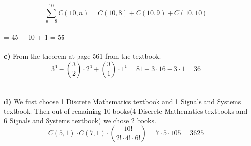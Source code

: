 \documentclass[12pt]{article}
\begin{document}
\[\sum_{n=8}^{10} C(10,n) = C(10,8) + C(10,9) + C(10,10)\]\\
\hspace*{6.8cm} =  45 + 10 + 1 = 56\\
\vspace*{0.4cm}\\
\textbf{c)} From the theorem at page 561 from the textbook.\\
\[3^{4} - \binom{3}{2}\cdot2^{4} + \binom{3}{1}\cdot1^{4} = 81 - 3\cdot16 - 3\cdot1 = 36\]\\
\vspace*{0.4cm}\\
\textbf{d)} We first choose 1  Discrete Mathematics textbook and 1 Signals and Systems textbook. Then out of remaining 10 books(4 Discrete Mathematics textbooks and 6 Signals and Systems textbook) we chose 2 books. \\
\[C(5,1)\cdot C(7,1)\cdot (\frac{10!}{2!\cdot4!\cdot6!}) = 7\cdot5\cdot105 = 3625\]\\
\vspace*{0.6cm}\\
\end{document}

